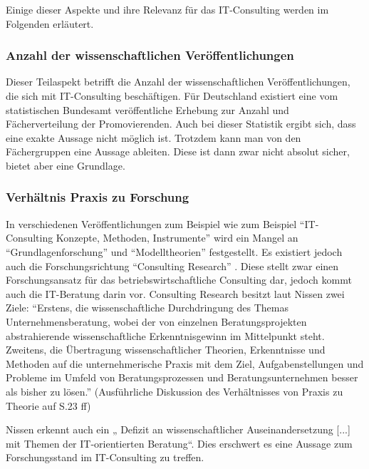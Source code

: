 Einige dieser Aspekte und ihre Relevanz für das IT-Consulting werden im Folgenden erläutert.

\subsubsection*{Anzahl der wissenschaftlichen Veröffentlichungen}
Dieser Teilaspekt betrifft die Anzahl der wissenschaftlichen Veröffentlichungen, die sich mit IT-Consulting beschäftigen. 
Für Deutschland existiert eine vom statistischen Bundesamt veröffentliche Erhebung zur Anzahl und Fächerverteilung der Promovierenden.\cite{destatis}
Auch bei dieser Statistik ergibt sich, dass eine exakte Aussage nicht möglich ist. Trotzdem kann man
von den Fächergruppen eine Aussage ableiten. Diese ist dann zwar nicht absolut sicher, bietet aber eine Grundlage.

\subsubsection*{Verhältnis Praxis zu Forschung}
In verschiedenen Veröffentlichungen zum Beispiel wie zum Beispiel ``IT-Consulting Konzepte, Methoden, Instrumente'' \cite[1]{IDSScheer} wird ein Mangel an ``Grundlagenforschung'' und ``Modelltheorien'' festgestellt. Es existiert jedoch auch die Forschungsrichtung ``Consulting Research'' \cite{NissenKlaukDeelmannMohe20120}. Diese stellt zwar einen Forschungsansatz für das betriebswirtschaftliche Consulting dar, jedoch kommt auch die IT-Beratung darin vor. Consulting Research besitzt laut Nissen zwei Ziele: ``Erstens, die wissenschaftliche Durchdringung des Themas Unternehmensberatung, wobei der von einzelnen Beratungsprojekten abstrahierende wissenschaftliche Erkenntnisgewinn im Mittelpunkt steht. Zweitens, die Übertragung wissenschaftlicher Theorien, Erkenntnisse und Methoden auf die unternehmerische Praxis mit dem Ziel, Aufgabenstellungen und Probleme im Umfeld von Beratungsprozessen und Beratungsunternehmen besser als bisher zu lösen.''
(Ausführliche Diskussion des Verhältnisses von Praxis zu Theorie auf S.23 ff)

Nissen erkennt auch ein „ Defizit an wissenschaftlicher Auseinandersetzung [...] mit Themen der IT-orientierten Beratung“. Dies erschwert es eine Aussage zum Forschungsstand im IT-Consulting zu treffen.


